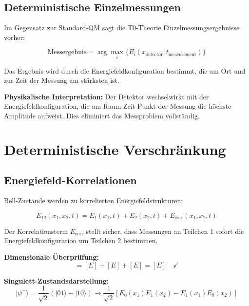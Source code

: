 \documentclass[12pt,a4paper]{report}
\begin{document}
	\subsection{Deterministische Einzelmessungen}
	\label{subsec:deterministic_measurements}
	
	Im Gegensatz zur Standard-QM sagt die T0-Theorie Einzelmessungsergebnisse vorher:
	
	\begin{equation}
		\text{Messergebnis} = \arg\max_i\{E_i(x_{\text{detector}}, t_{\text{measurement}})\}
	\end{equation}
	
	Das Ergebnis wird durch die Energiefeldkonfiguration bestimmt, die am Ort und zur Zeit der Messung am stärksten ist.
	
	\textbf{Physikalische Interpretation:}
	Der Detektor wechselwirkt mit der Energiefeldkonfiguration, die am Raum-Zeit-Punkt der Messung die höchste Amplitude aufweist. Dies eliminiert das Messproblem vollständig.
	
	\section{Deterministische Verschränkung}
	\label{sec:deterministic_entanglement}
	
	\subsection{Energiefeld-Korrelationen}
	\label{subsec:energy_field_correlations}
	
	Bell-Zustände werden zu korrelierten Energiefeldstrukturen:
	
	\begin{equation}
		E_{12}(x_1,x_2,t) = E_1(x_1,t) + E_2(x_2,t) + E_{\text{corr}}(x_1,x_2,t)
	\end{equation}
	
	Der Korrelationsterm $E_{\text{corr}}$ stellt sicher, dass Messungen an Teilchen 1 sofort die Energiefeldkonfiguration um Teilchen 2 bestimmen.
	
	\textbf{Dimensionale Überprüfung:}
	\begin{equation}
		[E_{12}] = [E] + [E] + [E] = [E] \quad \checkmark
	\end{equation}
	
	\textbf{Singulett-Zustandsdarstellung:}
	\begin{equation}
		|\psi^-\rangle = \frac{1}{\sqrt{2}}(|01\rangle - |10\rangle) \rightarrow \frac{1}{\sqrt{2}}[E_0(x_1)E_1(x_2) - E_1(x_1)E_0(x_2)]
	\end{equation}
	
\end{document}

